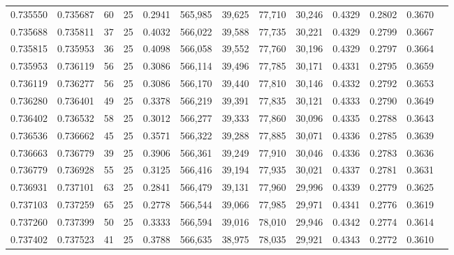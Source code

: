 \begin{tabular}{rrrrrrrrrrrrr}
0.735550 & 0.735687 &    60 &  25 &                                     0.2941 & 565,985 &  39,625 &  77,710 &  30,246 & 0.4329 & 0.2802 & 0.3670 \\
0.735688 & 0.735811 &    37 &  25 &                                     0.4032 & 566,022 &  39,588 &  77,735 &  30,221 & 0.4329 & 0.2799 & 0.3667 \\
0.735815 & 0.735953 &    36 &  25 &                                     0.4098 & 566,058 &  39,552 &  77,760 &  30,196 & 0.4329 & 0.2797 & 0.3664 \\
0.735953 & 0.736119 &    56 &  25 &                                     0.3086 & 566,114 &  39,496 &  77,785 &  30,171 & 0.4331 & 0.2795 & 0.3659 \\
0.736119 & 0.736277 &    56 &  25 &                                     0.3086 & 566,170 &  39,440 &  77,810 &  30,146 & 0.4332 & 0.2792 & 0.3653 \\
0.736280 & 0.736401 &    49 &  25 &                                     0.3378 & 566,219 &  39,391 &  77,835 &  30,121 & 0.4333 & 0.2790 & 0.3649 \\
0.736402 & 0.736532 &    58 &  25 &                                     0.3012 & 566,277 &  39,333 &  77,860 &  30,096 & 0.4335 & 0.2788 & 0.3643 \\
0.736536 & 0.736662 &    45 &  25 &                                     0.3571 & 566,322 &  39,288 &  77,885 &  30,071 & 0.4336 & 0.2785 & 0.3639 \\
0.736663 & 0.736779 &    39 &  25 &                                     0.3906 & 566,361 &  39,249 &  77,910 &  30,046 & 0.4336 & 0.2783 & 0.3636 \\
0.736779 & 0.736928 &    55 &  25 &                                     0.3125 & 566,416 &  39,194 &  77,935 &  30,021 & 0.4337 & 0.2781 & 0.3631 \\
0.736931 & 0.737101 &    63 &  25 &                                     0.2841 & 566,479 &  39,131 &  77,960 &  29,996 & 0.4339 & 0.2779 & 0.3625 \\
0.737103 & 0.737259 &    65 &  25 &                                     0.2778 & 566,544 &  39,066 &  77,985 &  29,971 & 0.4341 & 0.2776 & 0.3619 \\
0.737260 & 0.737399 &    50 &  25 &                                     0.3333 & 566,594 &  39,016 &  78,010 &  29,946 & 0.4342 & 0.2774 & 0.3614 \\
0.737402 & 0.737523 &    41 &  25 &                                     0.3788 & 566,635 &  38,975 &  78,035 &  29,921 & 0.4343 & 0.2772 & 0.3610 \\

\end{tabular}
